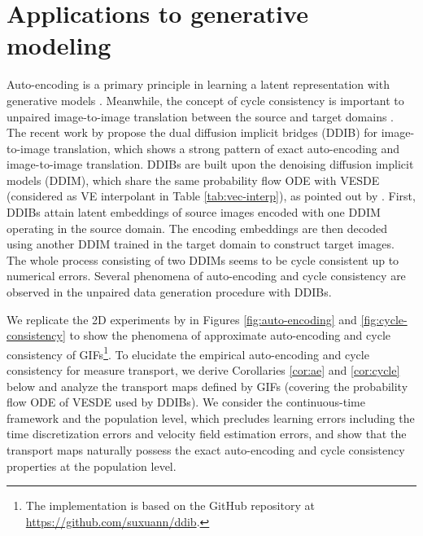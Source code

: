 \documentclass[twoside,11pt]{article}
\numberwithin{equation}{section}
\begin{document}
\section{Applications to generative modeling} \label{sec:app}

Auto-encoding is a primary principle in learning a latent representation with generative models \cite[Chapter 14]{goodfellow2016deep}. Meanwhile, the concept of cycle consistency
is important to unpaired image-to-image translation between the source and target domains \citep{zhu2017unpaired}. The recent work by \citet{su2023dual} propose the dual diffusion implicit bridges (DDIB) for image-to-image translation, which shows a strong pattern of exact auto-encoding and image-to-image translation. DDIBs are built upon the denoising diffusion implicit models (DDIM), which share the same probability flow ODE with VESDE (considered as VE interpolant in Table \ref{tab:vec-interp}), as pointed out by \cite[Proposition 1]{song2021denoising}.
First, DDIBs attain latent embeddings of source images encoded with one DDIM operating in the source domain. The encoding embeddings are then decoded using another DDIM trained in the target domain to construct target images. The whole process consisting of two DDIMs seems to be cycle consistent up to numerical errors. Several phenomena of auto-encoding and cycle consistency are observed in the unpaired data generation procedure with DDIBs.


We replicate the 2D experiments by \citet{su2023dual} in
Figures \ref{fig:auto-encoding} and \ref{fig:cycle-consistency}
to show the phenomena of approximate auto-encoding and cycle consistency of GIFs\footnote{The implementation is based on the GitHub repository at \url{https://github.com/suxuann/ddib}.}. To elucidate the empirical auto-encoding and cycle consistency for measure transport, we derive Corollaries \ref{cor:ae} and \ref{cor:cycle} below and analyze the transport maps defined by GIFs (covering the probability flow ODE of VESDE used by DDIBs). We consider the continuous-time framework and the population level, which precludes learning errors including the time discretization errors and velocity field estimation errors, and show that the transport maps naturally possess the exact auto-encoding and cycle consistency properties at the population level.

\end{document}
